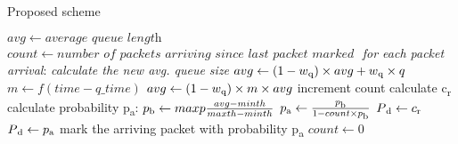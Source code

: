 \documentclass{article}
\begin{document}
\begin{algorithm}
\caption{Proposed scheme}
\begin{algorithmic}[1]
\Procedure{}{}
\State $avg \gets \textit{average queue length}$
\State $count \gets \textit{number of packets arriving since last packet marked }$
\BState \emph{for each packet arrival}:
\State \textit{calculate the new avg. queue size}
\State $avg \gets (1-w\textsubscript{q}) \times avg + w\textsubscript{q} \times q $  
\Else 
\State $m \gets f(time-q\_time)$
\State $avg \gets (1-w\textsubscript{q}) \times m \times avg $
\EndIf
{}
\State increment count
\State calculate c\textsubscript{r}
\State calculate probability p\textsubscript{a}:
\State $p\textsubscript{b} \gets maxp \frac{avg-minth}{maxth-minth}$
\State $p\textsubscript{a} \gets \frac{p\textsubscript{b}}{1-count \times p\textsubscript{b}}$
    \State $P\textsubscript{d} \gets c\textsubscript{r}$
    \Else
    \State $P\textsubscript{d} \gets p\textsubscript{a}$
    \EndIf
{}
    \State mark the arriving packet with probability p\textsubscript{a}
    \State $count \gets 0$
\EndIf
\EndProcedure
\end{algorithmic}
\end{algorithm}
\end{document}
